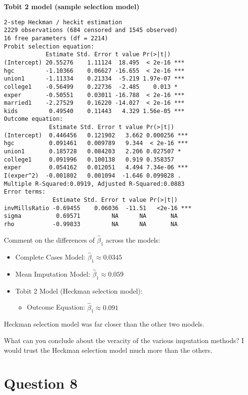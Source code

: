 \documentclass{article}
\begin{document}
\textbf{Tobit 2 model (sample selection model)}
\begin{verbatim}
2-step Heckman / heckit estimation
2229 observations (684 censored and 1545 observed)
16 free parameters (df = 2214)
Probit selection equation:
            Estimate Std. Error t value Pr(>|t|)    
(Intercept) 20.55276    1.11124  18.495  < 2e-16 ***
hgc         -1.10366    0.06627 -16.655  < 2e-16 ***
union1      -1.11334    0.21334  -5.219 1.97e-07 ***
college1    -0.56499    0.22736  -2.485    0.013 *  
exper       -0.50551    0.03011 -16.788  < 2e-16 ***
married1    -2.27529    0.16220 -14.027  < 2e-16 ***
kids         0.49540    0.11443   4.329 1.56e-05 ***
Outcome equation:
             Estimate Std. Error t value Pr(>|t|)    
(Intercept)  0.446456   0.121902   3.662 0.000256 ***
hgc          0.091461   0.009789   9.344  < 2e-16 ***
union1       0.185728   0.084203   2.206 0.027507 *  
college1     0.091996   0.100138   0.919 0.358357    
exper        0.054162   0.012051   4.494 7.34e-06 ***
I(exper^2)  -0.001802   0.001094  -1.646 0.099828 .  
Multiple R-Squared:0.0919, Adjusted R-Squared:0.0883
Error terms:
              Estimate Std. Error t value Pr(>|t|)    
invMillsRatio -0.69455    0.06036  -11.51   <2e-16 ***
sigma          0.69571         NA      NA       NA    
rho           -0.99833         NA      NA       NA    
\end{verbatim}

Comment on the differences of $\hat{\beta}_1$ across the models:
\begin{itemize}
\item Complete Cases Model: $\hat{\beta}_1 \approx 0.0345$
\item Mean Imputation Model: $\hat{\beta}_1 \approx 0.059$
\item Tobit 2 Model (Heckman selection model):
  \begin{itemize}
    \item Outcome Equation: $\hat{\beta}_1 \approx 0.091$
  \end{itemize}
\end{itemize}

Heckman selection model was far closer than the other two models.

What can you conclude about the veracity of the various imputation methods? I would trust the Heckman selection model much more than the others.

\section*{Question 8}
\end{document}
